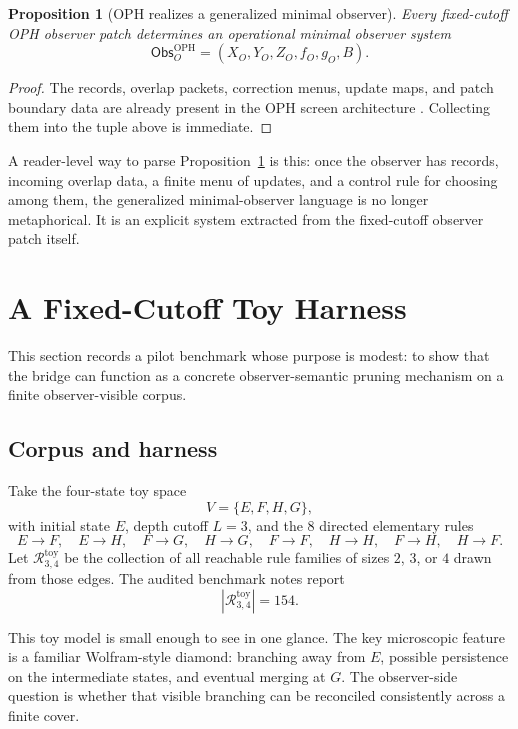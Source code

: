 \documentclass[11pt]{article}
\newtheorem{proposition}[theorem]{Proposition}
\theoremstyle{remark}
\theoremstyle{plain}
\begin{document}
\begin{proposition}[OPH realizes a generalized minimal observer]
\label{prop:minimalobserver}
Every fixed-cutoff OPH observer patch determines an operational minimal observer system
\[
\mathsf{Obs}^{\mathrm{OPH}}_O=(X_O,Y_O,Z_O,f_O,g_O,B).
\]
\end{proposition}

\begin{proof}
The records, overlap packets, correction menus, update maps, and patch boundary data are already present in the OPH screen architecture \cite{ophmicrophysics}. Collecting them into the tuple above is immediate.
\end{proof}

A reader-level way to parse Proposition~\ref{prop:minimalobserver} is this: once the observer has records, incoming overlap data, a finite menu of updates, and a control rule for choosing among them, the generalized minimal-observer language is no longer metaphorical. It is an explicit system extracted from the fixed-cutoff observer patch itself.

\section{A Fixed-Cutoff Toy Harness}
\label{sec:toy}

This section records a pilot benchmark whose purpose is modest: to show that the bridge can function as a concrete observer-semantic pruning mechanism on a finite observer-visible corpus.

\subsection{Corpus and harness}

Take the four-state toy space
\[
V=\{E,F,H,G\},
\]
with initial state \(E\), depth cutoff \(L=3\), and the 8 directed elementary rules
\[
E\to F,\quad E\to H,\quad F\to G,\quad H\to G,\quad
F\to F,\quad H\to H,\quad F\to H,\quad H\to F.
\]
Let \(\mathcal R^{\mathrm{toy}}_{3,4}\) be the collection of all reachable rule families of sizes \(2\), \(3\), or \(4\) drawn from those edges. The audited benchmark notes report
\[
|\mathcal R^{\mathrm{toy}}_{3,4}|=154.
\]

This toy model is small enough to see in one glance. The key microscopic feature is a familiar Wolfram-style diamond: branching away from \(E\), possible persistence on the intermediate states, and eventual merging at \(G\). The observer-side question is whether that visible branching can be reconciled consistently across a finite cover.
\end{document}
